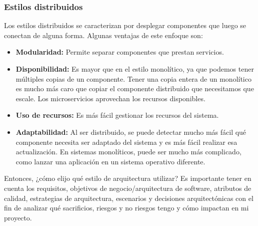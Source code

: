 \documentclass[executivepaper]{article}
\begin{document}
\subsubsection*{Estilos distribuidos}

Los estilos distribuidos se caracterizan por desplegar componentes que luego se conectan de alguna forma. Algunas ventajas de este enfoque son:

\begin{itemize}
\item \textbf{Modularidad:} Permite separar componentes que prestan servicios.
\item \textbf{Disponibilidad:} Es mayor que en el estilo monolítico, ya que podemos tener múltiples copias de un componente. Tener una copia entera de un monolítico es mucho más caro que copiar el componente distribuido que necesitamos que escale. Los microservicios aprovechan los recursos disponibles.
\item \textbf{Uso de recursos:} Es más fácil gestionar los recursos del sistema.
\item \textbf{Adaptabilidad:} Al ser distribuido, se puede detectar mucho más fácil qué componente necesita ser adaptado del sistema y es más fácil realizar esa actualización. En sistemas monolíticos, puede ser mucho más complicado, como lanzar una aplicación en un sistema operativo diferente.
\end{itemize}

Entonces, ¿cómo elijo qué estilo de arquitectura utilizar? Es importante tener en cuenta los requisitos, objetivos de negocio/arquitectura de software, atributos de calidad, estrategias de arquitectura, escenarios y decisiones arquitectónicas con el fin de analizar qué sacrificios, riesgos y no riesgos tengo y cómo impactan en mi proyecto.
\end{document}
